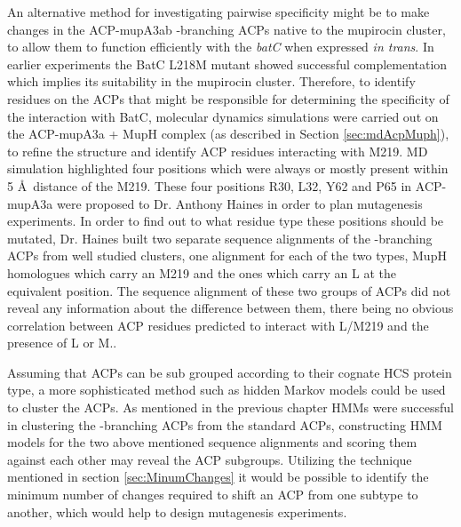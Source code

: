 An alternative method for investigating pairwise specificity might be to make changes in the ACP-mupA3ab \bet-branching ACPs native to the mupirocin cluster, to allow them to function efficiently with the \textit{batC} when expressed \textit{in trans}. In earlier experiments the BatC L218M mutant showed successful complementation which implies its suitability in the mupirocin cluster. Therefore, to identify residues on the ACPs that might be responsible for determining the specificity of the interaction with BatC, molecular dynamics simulations were carried out on the ACP-mupA3a + MupH complex (as described in Section \ref{sec:mdAcpMuph}), to refine the structure and identify ACP residues interacting with M219. MD simulation highlighted four positions which were always or mostly present within 5 \AA \ distance of the M219. These four positions  R30, L32, Y62 and P65 in ACP-mupA3a were proposed to Dr. Anthony Haines in order to plan mutagenesis experiments. In order to find out to what residue type these positions should be mutated, Dr. Haines built two separate sequence alignments of the \bet-branching ACPs from well studied clusters, one alignment for each of the two types, MupH homologues which carry an M219 and the ones which carry an L at the equivalent position. The sequence alignment of these two groups of ACPs did not reveal any information about the difference between them, there being no obvious correlation between ACP residues predicted to interact with L/M219 and the presence of L or M.. 

Assuming that ACPs can be sub grouped according to their cognate HCS protein type, a more sophisticated method such as hidden Markov models could be used to cluster the ACPs. As mentioned in the previous chapter HMMs were successful in clustering the \bet-branching ACPs from the standard ACPs, constructing HMM models for the two above mentioned sequence alignments and scoring them against each other may reveal the ACP subgroups. Utilizing the technique mentioned in section \ref{sec:MinumChanges} it would be possible to identify the minimum number of changes required to shift an ACP from one subtype to another, which would help to design mutagenesis experiments.  
